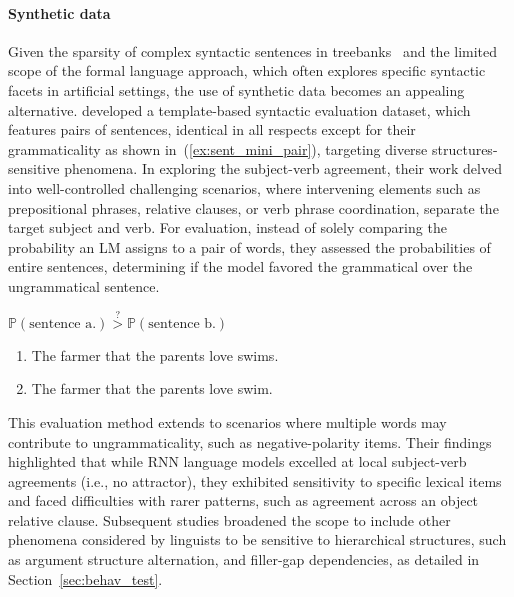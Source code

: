 \paragraph{Synthetic data} Given the sparsity of complex syntactic sentences in treebanks~\citep{gulordava-etal-2018-colorless} and the limited scope of the formal language approach, which often explores specific syntactic facets in artificial settings, the use of synthetic data becomes an appealing alternative. \cite{marvin-linzen-2018-targeted} developed a template-based syntactic evaluation dataset, which features pairs of sentences, identical in all respects except for their grammaticality as shown in~(\ref{ex:sent_mini_pair}), targeting diverse structures-sensitive phenomena. In exploring the subject-verb agreement, their work delved into well-controlled challenging scenarios, where intervening elements such as prepositional phrases, relative clauses, or verb phrase coordination, separate the target subject and verb. For evaluation, instead of solely comparing the probability an LM assigns to a pair of words, they assessed the probabilities of entire sentences, determining if the model favored the grammatical over the ungrammatical sentence. 
\begin{exe}
   \ex\label{ex:sent_mini_pair} $\mathbb{P}(\textrm{sentence a.}) \overset{?}{>}
      \mathbb{P}(\textrm{sentence b.})$ \\
\vspace{-0.8\baselineskip}
\begin{enumerate}[label=\alph*.]
    \item The farmer that the parents love swims.
    \item \raisebox{0.8ex}{\textasteriskcentered}The farmer that the parents love swim.
\end{enumerate}
\end{exe}

\noindent This evaluation method extends to scenarios where multiple words may contribute to ungrammaticality, such as negative-polarity items. Their findings highlighted that while RNN language models excelled at local subject-verb agreements (i.e., no attractor), they exhibited sensitivity to specific lexical items and faced difficulties with rarer patterns, such as agreement across an object relative clause. Subsequent studies broadened the scope to include other phenomena considered by linguists to be sensitive to hierarchical structures, such as argument structure alternation, and filler-gap dependencies, as detailed in Section~\ref{sec:behav_test}.

